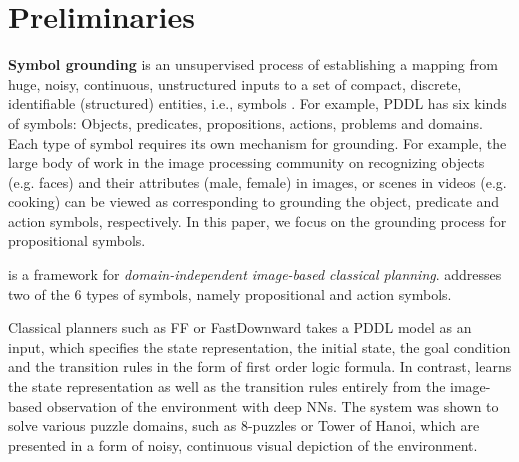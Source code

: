 

\section{Preliminaries}
\label{background}

\textbf{Symbol grounding} is an unsupervised process of establishing a mapping
from huge, noisy, continuous, unstructured inputs
to a set of compact, %
discrete, identifiable (structured) entities, i.e., symbols \cite{Asai2018}.
For example, PDDL has six kinds of symbols: Objects, predicates, propositions, actions, problems and domains.
Each type of symbol requires its own mechanism for grounding.
For example, the large body of work in the image processing community on recognizing 
objects (e.g. faces) and their attributes (male, female) in images, or scenes in videos (e.g. cooking)
can be viewed as corresponding to grounding the object, predicate and action symbols, respectively.
In this paper, we focus on the grounding process for propositional symbols.

\textbf{\latentplanner} \cite{Asai2018} is a framework for
\emph{domain-independent image-based classical planning}.
\latentplanner addresses two of the 6 types of symbols, %
namely propositional and action symbols.

Classical planners such as FF \cite{Hoffmann01} or
FastDownward \cite{Helmert04} takes a PDDL model as an input, which
specifies the state representation, the initial state, the goal
condition and the transition rules in the form of first order logic
formula.  In contrast, \latentplanner learns the state representation as well as the transition rules
entirely from the image-based observation of the environment with deep NNs.
The system was shown to solve various puzzle domains, such as 8-puzzles or Tower of Hanoi,
which are presented in a form of noisy, continuous visual depiction of the environment.

